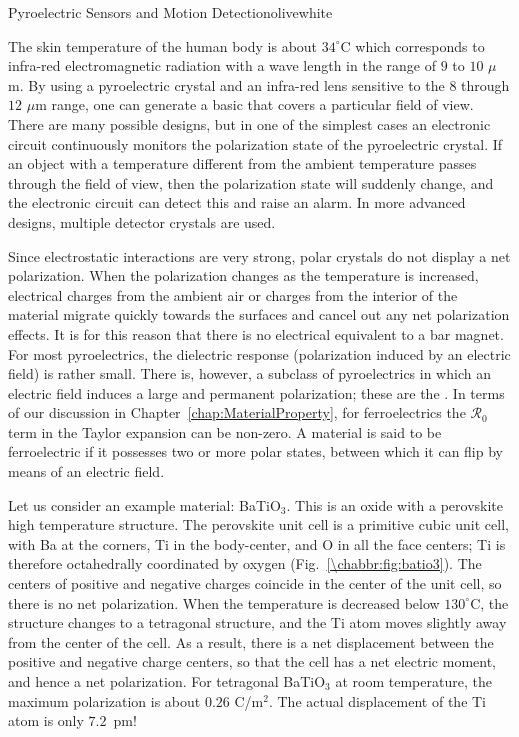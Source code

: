 \begin{messagebox}{Pyroelectric Sensors and Motion Detection}{olive}{\icinfo}{white}
\begin{minipage}{\textwidth}
The skin temperature of the human body is about $34^{\circ}$C which corresponds to infra-red electromagnetic radiation with a wave length in the range of $9$ to $10$ $\mu$m.  By using a pyroelectric crystal and an infra-red lens sensitive to the $8$ through $12$ $\mu$m range, one can generate a basic  that covers a particular field of view. There are many possible designs, but in one of the simplest cases an electronic circuit continuously monitors the polarization state of the pyroelectric crystal. If an object with a temperature different from the ambient temperature passes through the field of view, then the polarization state will suddenly change, and the electronic circuit can detect this and raise an alarm.  In more advanced designs, multiple detector crystals are used. 
\end{minipage}
\end{messagebox}

Since electrostatic interactions are very strong, polar crystals do not display a net polarization.  When the  polarization changes as the temperature is increased, electrical charges from the ambient air or charges from the interior of the material migrate quickly towards the surfaces and cancel out any net polarization effects.  It is for this reason that there is no electrical equivalent to a bar magnet.  For most pyroelectrics, the dielectric response (polarization induced by an electric field) is rather small. There is, however, a subclass of pyroelectrics in which an electric field induces a large and permanent polarization; these are the .  In terms of our discussion in Chapter~\ref{chap:MaterialProperty}, for ferroelectrics the $\mathcal{R}_0$ term in the Taylor expansion can be non-zero.  A material is said to be ferroelectric if it possesses two or more polar states, between which it can flip by means of an electric field.

Let us consider an example material: BaTiO$_3$.  This is an oxide with a perovskite high temperature structure.  The perovskite unit cell is a primitive cubic unit cell, with Ba at the corners, Ti in the body-center, and O in all the face centers; Ti is therefore octahedrally coordinated by oxygen (Fig.~\ref{\chabbr:fig:batio3}). The centers of positive and negative charges coincide in the center of the unit cell, so there is no net polarization.  When the temperature is decreased below $130^{\circ}$C, the structure changes to a tetragonal structure, and the Ti atom moves slightly away from the center of the cell.  As a result, there is a net displacement between the positive and negative charge centers, so that the cell has a net electric moment, and hence a net polarization.  For tetragonal BaTiO$_3$ at room temperature, the maximum polarization is about $0.26$ C/m$^2$.  The actual displacement of the Ti atom is only $7.2$~pm!

